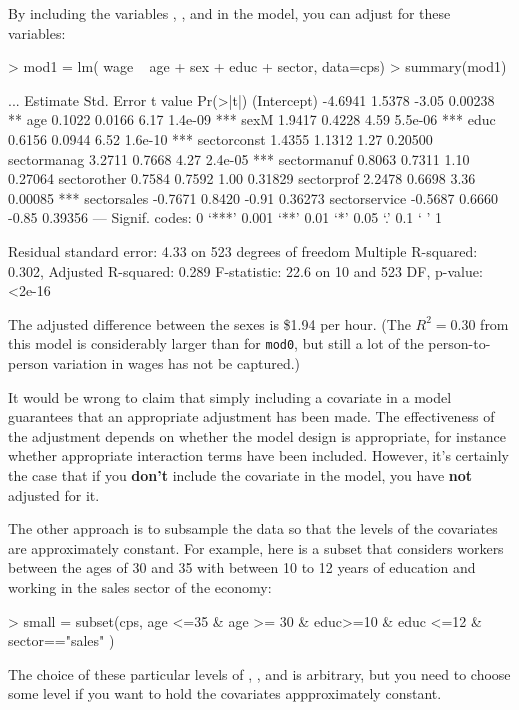 By including the variables , , and  in the
model, you can adjust for these variables:
\begin{Schunk}
\begin{Sinput}
> mod1 = lm( wage ~ age + sex + educ + sector, data=cps)
> summary(mod1)
\end{Sinput}
\begin{Soutput}
...
              Estimate Std. Error t value Pr(>|t|)    
(Intercept)    -4.6941     1.5378   -3.05  0.00238 ** 
age             0.1022     0.0166    6.17  1.4e-09 ***
sexM            1.9417     0.4228    4.59  5.5e-06 ***
educ            0.6156     0.0944    6.52  1.6e-10 ***
sectorconst     1.4355     1.1312    1.27  0.20500    
sectormanag     3.2711     0.7668    4.27  2.4e-05 ***
sectormanuf     0.8063     0.7311    1.10  0.27064    
sectorother     0.7584     0.7592    1.00  0.31829    
sectorprof      2.2478     0.6698    3.36  0.00085 ***
sectorsales    -0.7671     0.8420   -0.91  0.36273    
sectorservice  -0.5687     0.6660   -0.85  0.39356    
---
Signif. codes:  0 ‘***’ 0.001 ‘**’ 0.01 ‘*’ 0.05 ‘.’ 0.1 ‘ ’ 1 

Residual standard error: 4.33 on 523 degrees of freedom
Multiple R-squared: 0.302,	Adjusted R-squared: 0.289 
F-statistic: 22.6 on 10 and 523 DF,  p-value: <2e-16 
\end{Soutput}
\end{Schunk}
The adjusted difference between the sexes is \$1.94 per hour.  (The
$R^2=0.30$ from this model is considerably larger than for \texttt{mod0},
but still a lot of the person-to-person variation in wages has not
be captured.)

It would be wrong to claim that simply including a covariate in a
model guarantees that an appropriate adjustment has been made.  The
effectiveness of the adjustment depends on whether the model design is
appropriate, for instance whether appropriate interaction terms have
been included.  However, it's certainly the case that if you {\bf don't}
include the covariate in the model, you have {\bf not} adjusted for
it.

The other approach is to subsample the data so that the levels of the
covariates are approximately constant.  For example, here is a subset
that considers workers between the ages of 30 and 35 with between 10
to 12 years of education and working in the sales sector of the
economy:
\begin{Schunk}
\begin{Sinput}
> small = subset(cps, age <=35 & age >= 30 & 
                       educ>=10 & educ <=12 & 
                       sector=="sales" )
\end{Sinput}
\end{Schunk}
The choice of these particular levels of , , and
 is arbitrary, but you need to choose some level if you
want to hold the covariates appproximately constant.

